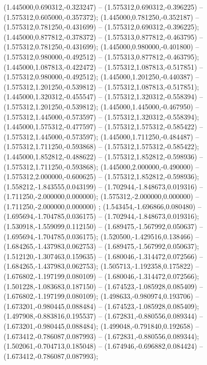  (1.445000,0.690312,-0.323247) -- (1.575312,0.690312,-0.396225) -- (1.575312,0.605000,-0.357372);
 (1.445000,0.781250,-0.352187) -- (1.575312,0.781250,-0.431699) -- (1.575312,0.690312,-0.396225);
 (1.445000,0.877812,-0.378372) -- (1.575313,0.877812,-0.463795) -- (1.575312,0.781250,-0.431699);
 (1.445000,0.980000,-0.401800) -- (1.575312,0.980000,-0.492512) -- (1.575313,0.877812,-0.463795);
 (1.445000,1.087813,-0.422472) -- (1.575312,1.087813,-0.517851) -- (1.575312,0.980000,-0.492512);
 (1.445000,1.201250,-0.440387) -- (1.575312,1.201250,-0.539812) -- (1.575312,1.087813,-0.517851);
 (1.445000,1.320312,-0.455547) -- (1.575312,1.320312,-0.558394) -- (1.575312,1.201250,-0.539812);
 (1.445000,1.445000,-0.467950) -- (1.575312,1.445000,-0.573597) -- (1.575312,1.320312,-0.558394);
 (1.445000,1.575312,-0.477597) -- (1.575312,1.575312,-0.585422) -- (1.575312,1.445000,-0.573597);
 (1.445000,1.711250,-0.484487) -- (1.575312,1.711250,-0.593868) -- (1.575312,1.575312,-0.585422);
 (1.445000,1.852812,-0.488622) -- (1.575312,1.852812,-0.598936) -- (1.575312,1.711250,-0.593868);
 (1.445000,2.000000,-0.490000) -- (1.575312,2.000000,-0.600625) -- (1.575312,1.852812,-0.598936);
 (1.558212,-1.843555,0.043199) -- (1.702944,-1.848673,0.019316) -- (1.711250,-2.000000,0.000000);
 (1.575312,-2.000000,0.000000) -- (1.711250,-2.000000,0.000000) ;
 (1.543454,-1.696866,0.080480) -- (1.695694,-1.704785,0.036175) -- (1.702944,-1.848673,0.019316);
 (1.530918,-1.559099,0.112150) -- (1.689475,-1.567992,0.050637) -- (1.695694,-1.704785,0.036175);
 (1.520500,-1.429516,0.138466) -- (1.684265,-1.437983,0.062753) -- (1.689475,-1.567992,0.050637);
 (1.512120,-1.307463,0.159635) -- (1.680046,-1.314472,0.072566) -- (1.684265,-1.437983,0.062753);
 (1.505713,-1.192358,0.175822) -- (1.676802,-1.197199,0.080109) -- (1.680046,-1.314472,0.072566);
 (1.501228,-1.083683,0.187150) -- (1.674523,-1.085928,0.085409) -- (1.676802,-1.197199,0.080109);
 (1.498633,-0.980974,0.193706) -- (1.673201,-0.980445,0.088484) -- (1.674523,-1.085928,0.085409);
 (1.497908,-0.883816,0.195537) -- (1.672831,-0.880556,0.089344) -- (1.673201,-0.980445,0.088484);
 (1.499048,-0.791840,0.192658) -- (1.673412,-0.786087,0.087993) -- (1.672831,-0.880556,0.089344);
 (1.502061,-0.704713,0.185048) -- (1.674946,-0.696882,0.084424) -- (1.673412,-0.786087,0.087993);
